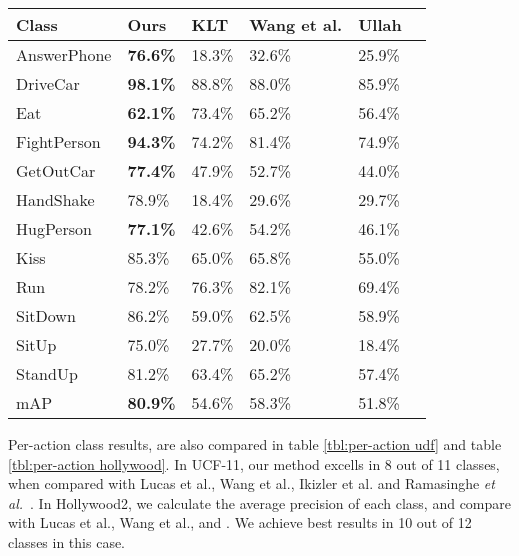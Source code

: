 \begin{table*}[]
\centering
\caption{Per-class mAP comparison with state-of-the-art on Hollywood2.}\label{tbl:per-action hollywood}
\begin{tabular}{|l|l|l|l|l|l|}
\hline
Class            & Ours           & KLT\cite{lucas1981iterative} & Wang et al.\cite{wang2011action} & Ullah\cite{ullah2010improving}   \\ \hline \hline
AnswerPhone      & \textbf{76.6\%}& 18.3\%    & 32.6\%    & 25.9\%        \\
DriveCar         & \textbf{98.1\%}& 88.8\%    & 88.0\%    & 85.9\%     \\
Eat              & \textbf{62.1\%}& 73.4\%    & 65.2\%    & 56.4\%         \\
FightPerson      & \textbf{94.3\%}& 74.2\%    & 81.4\%    & 74.9\%         \\
GetOutCar        & \textbf{77.4\%}& 47.9\%    & 52.7\%    & 44.0\%       \\
HandShake        & 78.9\%         & 18.4\%    & 29.6\%    & 29.7\%         \\
HugPerson        & \textbf{77.1\%}& 42.6\%    & 54.2\%    & 46.1\%         \\
Kiss             & 85.3\%         & 65.0\%    & 65.8\%    & 55.0\%         \\
Run              & 78.2\%         & 76.3\%    & 82.1\%    & 69.4\%         \\
SitDown          & 86.2\%         & 59.0\%    & 62.5\%    & 58.9\%         \\
SitUp            & 75.0\%         & 27.7\%    & 20.0\%    & 18.4\%         \\
StandUp          & 81.2\%         & 63.4\%    & 65.2\%    & 57.4\%         \\ \hline
mAP              &     \textbf{80.9\%}           &   54.6\%         &     58.3\%       &     51.8\%      \\ \hline
\end{tabular}
\end{table*}




Per-action class results, are also compared in table \ref{tbl:per-action udf} and table \ref{tbl:per-action hollywood}. In UCF-11, our method excells
in 8 out of 11 classes, when compared with Lucas et al.\cite{lucas1981iterative}, Wang et al.\cite{wang2011action}, Ikizler et al.\cite{ikizler2010object}
and Ramasinghe \emph{et al.}~\cite{7486474}. In Hollywood2,
we calculate the average precision of each class, and compare with Lucas et al.\cite{lucas1981iterative}, Wang et al.\cite{wang2011action}, and \cite{ullah2010improving}.
We achieve best results in 10 out of 12 classes in this case.






